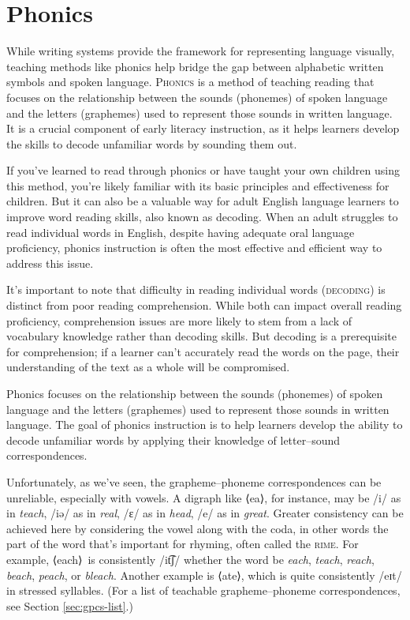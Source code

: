 \section{Phonics} \label{sec:phonics}

While writing systems provide the framework for representing language visually, teaching methods like phonics help bridge the gap between alphabetic written symbols and spoken language. \textsc{Phonics} is a method of teaching reading that focuses on the relationship between the sounds (phonemes) of spoken language and the letters (graphemes) used to represent those sounds in written language. It is a crucial component of early literacy instruction, as it helps learners develop the skills to decode unfamiliar words by sounding them out.

If you've learned to read through phonics or have taught your own children using this method, you're likely familiar with its basic principles and effectiveness for children. But it can also be a valuable way for adult English language learners to improve word reading skills, also known as decoding. When an adult struggles to read individual words in English, despite having adequate oral language proficiency, phonics instruction is often the most effective and efficient way to address this issue.

It's important to note that difficulty in reading individual words (\textsc{decoding}) is distinct from poor reading comprehension. While both can impact overall reading proficiency, comprehension issues are more likely to stem from a lack of vocabulary knowledge rather than decoding skills. But decoding is a prerequisite for comprehension; if a learner can't accurately read the words on the page, their understanding of the text as a whole will be compromised.

Phonics focuses on the relationship between the sounds (phonemes) of spoken language and the letters (graphemes) used to represent those sounds in written language. The goal of phonics instruction is to help learners develop the ability to decode unfamiliar words by applying their knowledge of letter--sound correspondences.

Unfortunately, as we've seen, the grapheme--phoneme correspondences can be unreliable, especially with vowels. A digraph like ⟨ea⟩, for instance, may be /i/ as in \textit{teach}, /iə/ as in \textit{real}, /ɛ/ as in \textit{head}, /e/ as in \textit{great}. Greater consistency can be achieved here by considering the vowel along with the coda, in other words the part of the word that's important for rhyming, often called the \textsc{rime}. For example, ⟨each⟩~is consistently /it͡ʃ/ whether the word be \textit{each}, \textit{teach}, \textit{reach}, \textit{beach}, \textit{peach}, or \textit{bleach}. Another example is ⟨ate⟩, which is quite consistently /eɪt/ in stressed syllables. (For a list of teachable grapheme--phoneme correspondences, see Section \ref{sec:gpcs-list}.)

